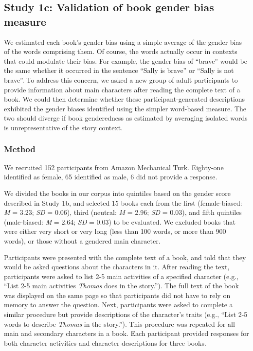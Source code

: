 \documentclass[
  english,
  ,man,floatsintext]{apa6}
\begin{document}
\hypertarget{study-1c-validation-of-book-gender-bias-measure}{%
\subsection{Study 1c: Validation of book gender bias measure}\label{study-1c-validation-of-book-gender-bias-measure}}

We estimated each book's gender bias using a simple average of the gender bias of the words comprising them. Of course, the words actually occur in contexts that could modulate their bias. For example, the gender bias of \enquote{brave} would be the same whether it occurred in the sentence \enquote{Sally is brave} or \enquote{Sally is not brave}. To address this concern, we asked a new group of adult participants to provide information about main characters after reading the complete text of a book. We could then determine whether these participant-generated descriptions exhibited the gender biases identified using the simpler word-based measure. The two should diverge if book genderedness as estimated by averaging isolated words is unrepresentative of the story context.

\hypertarget{method-2}{%
\subsubsection{Method}\label{method-2}}

We recruited 152 participants from Amazon Mechanical Turk. Eighty-one identified as female, 65 identified as male, 6 did not provide a response.

We divided the books in our corpus into quintiles based on the gender score described in Study 1b, and selected 15 books each from the first (female-biased: \emph{M} = 3.23; \emph{SD} = 0.06), third (neutral: \emph{M} = 2.96; \emph{SD} = 0.03), and fifth quintiles (male-biased: \emph{M} = 2.64; \emph{SD} = 0.03) to be evaluated. We excluded books that were either very short or very long (less than 100 words, or more than 900 words), or those without a gendered main character.

Participants were presented with the complete text of a book, and told that they would be asked questions about the characters in it. After reading the text, participants were asked to list 2-5 main activities of a specified character (e.g., \enquote{List 2-5 main activities \emph{Thomas} does in the story.}). The full text of the book was displayed on the same page so that participants did not have to rely on memory to answer the question. Next, participants were asked to complete a similar procedure but provide descriptions of the character's traits (e.g., \enquote{List 2-5 words to describe \emph{Thomas} in the story.}). This procedure was repeated for all main and secondary characters in a book. Each participant provided responses for both character activities and character descriptions for three books.
\end{document}
